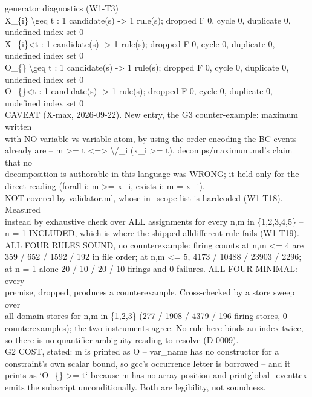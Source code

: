 \documentclass[10pt,a4paper]{article}
\newcommand{\diag}[1]{{\small\itshape\raggedright #1\par}}
\begin{document}
\diag{generator diagnostics (W1-T3)\\{} X\_\{i\} \textbackslash{}geq t : 1 candidate(s) -> 1 rule(s); dropped F 0, cycle 0, duplicate 0, undefined index set 0\\{} X\_\{i\}<t : 1 candidate(s) -> 1 rule(s); dropped F 0, cycle 0, duplicate 0, undefined index set 0\\{} O\_\{\} \textbackslash{}geq t : 1 candidate(s) -> 1 rule(s); dropped F 0, cycle 0, duplicate 0, undefined index set 0\\{} O\_\{\}<t : 1 candidate(s) -> 1 rule(s); dropped F 0, cycle 0, duplicate 0, undefined index set 0\\{} CAVEAT (X-max, 2026-09-22). New entry, the G3 counter-example: maximum written\\{} with NO variable-vs-variable atom, by using the order encoding the BC events\\{} already are -- m >= t <=> \textbackslash{}/\_i (x\_i >= t). decomps/maximum.md's claim that no\\{} decomposition is authorable in this language was WRONG; it held only for the\\{} direct reading (forall i: m >= x\_i, exists i: m = x\_i).\\{} NOT covered by validator.ml, whose in\_scope list is hardcoded (W1-T18). Measured\\{} instead by exhaustive check over ALL assignments for every n,m in \{1,2,3,4,5\} --\\{} n = 1 INCLUDED, which is where the shipped alldifferent rule fails (W1-T19).\\{} ALL FOUR RULES SOUND, no counterexample: firing counts at n,m <= 4 are\\{} 359 / 652 / 1592 / 192 in file order; at n,m <= 5, 4173 / 10488 / 23903 / 2296;\\{} at n = 1 alone 20 / 10 / 20 / 10 firings and 0 failures. ALL FOUR MINIMAL: every\\{} premise, dropped, produces a counterexample. Cross-checked by a store sweep over\\{} all domain stores for n,m in \{1,2,3\} (277 / 1908 / 4379 / 196 firing stores, 0\\{} counterexamples); the two instruments agree. No rule here binds an index twice,\\{} so there is no quantifier-ambiguity reading to resolve (D-0009).\\{} G2 COST, stated: m is printed as O -- var\_name has no constructor for a\\{} constraint's own scalar bound, so gcc's occurrence letter is borrowed -- and it\\{} prints as `O\_\{\} >= t` because m has no array position and printglobal\_eventtex\\{} emits the subscript unconditionally. Both are legibility, not soundness.}
\end{document}
